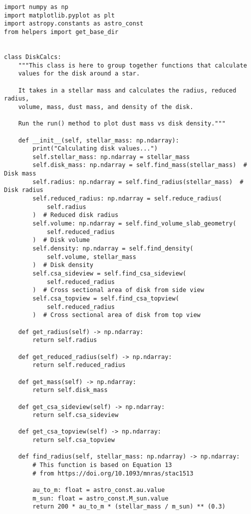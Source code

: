 \begin{lstlisting}
import numpy as np
import matplotlib.pyplot as plt
import astropy.constants as astro_const
from helpers import get_base_dir


class DiskCalcs:
    """This class is here to group together functions that calculate
    values for the disk around a star.

    It takes in a stellar mass and calculates the radius, reduced radius,
    volume, mass, dust mass, and density of the disk.

    Run the run() method to plot dust mass vs disk density."""

    def __init__(self, stellar_mass: np.ndarray):
        print("Calculating disk values...")
        self.stellar_mass: np.ndarray = stellar_mass
        self.disk_mass: np.ndarray = self.find_mass(stellar_mass)  # Disk mass
        self.radius: np.ndarray = self.find_radius(stellar_mass)  # Disk radius
        self.reduced_radius: np.ndarray = self.reduce_radius(
            self.radius
        )  # Reduced disk radius
        self.volume: np.ndarray = self.find_volume_slab_geometry(
            self.reduced_radius
        )  # Disk volume
        self.density: np.ndarray = self.find_density(
            self.volume, stellar_mass
        )  # Disk density
        self.csa_sideview = self.find_csa_sideview(
            self.reduced_radius
        )  # Cross sectional area of disk from side view
        self.csa_topview = self.find_csa_topview(
            self.reduced_radius
        )  # Cross sectional area of disk from top view

    def get_radius(self) -> np.ndarray:
        return self.radius

    def get_reduced_radius(self) -> np.ndarray:
        return self.reduced_radius

    def get_mass(self) -> np.ndarray:
        return self.disk_mass

    def get_csa_sideview(self) -> np.ndarray:
        return self.csa_sideview

    def get_csa_topview(self) -> np.ndarray:
        return self.csa_topview

    def find_radius(self, stellar_mass: np.ndarray) -> np.ndarray:
        # This function is based on Equation 13
        # from https://doi.org/10.1093/mnras/stac1513

        au_to_m: float = astro_const.au.value
        m_sun: float = astro_const.M_sun.value
        return 200 * au_to_m * (stellar_mass / m_sun) ** (0.3)


\end{lstlisting}
